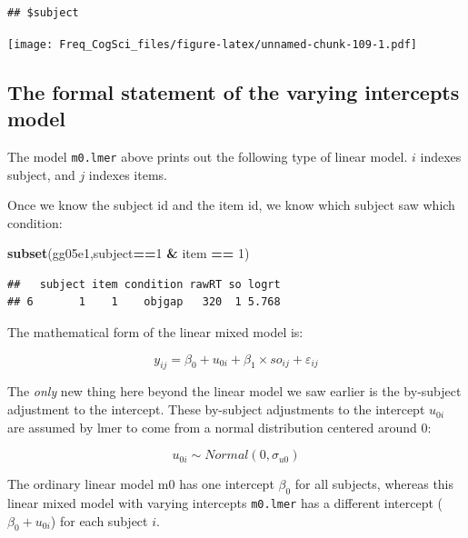 \documentclass[12pt,]{krantz}
\newenvironment{Shaded}{\begin{snugshade}}{\end{snugshade}}
\newcommand{\DecValTok}[1]{\textcolor[rgb]{0.00,0.00,0.81}{#1}}
\newcommand{\KeywordTok}[1]{\textcolor[rgb]{0.13,0.29,0.53}{\textbf{#1}}}
\newcommand{\NormalTok}[1]{#1}
\newcommand{\OperatorTok}[1]{\textcolor[rgb]{0.81,0.36,0.00}{\textbf{#1}}}
\newcommand{\StringTok}[1]{\textcolor[rgb]{0.31,0.60,0.02}{#1}}
\begin{document}
\begin{verbatim}
## $subject
\end{verbatim}

\texttt{[image: Freq\_CogSci\_files/figure-latex/unnamed-chunk-109-1.pdf]}

\hypertarget{the-formal-statement-of-the-varying-intercepts-model}{%
\subsection{The formal statement of the varying intercepts model}\label{the-formal-statement-of-the-varying-intercepts-model}}

The model \texttt{m0.lmer} above prints out the following type of linear model. \(i\) indexes subject, and \(j\) indexes items.

Once we know the subject id and the item id, we know which subject saw which condition:

\begin{Shaded}
\begin{Highlighting}[]
\KeywordTok{subset}\NormalTok{(gg05e1,subject}\OperatorTok{==}\DecValTok{1} \OperatorTok{&}\StringTok{ }\NormalTok{item }\OperatorTok{==}\StringTok{ }\DecValTok{1}\NormalTok{)}
\end{Highlighting}
\end{Shaded}

\begin{verbatim}
##   subject item condition rawRT so logrt
## 6       1    1    objgap   320  1 5.768
\end{verbatim}

The mathematical form of the linear mixed model is:

\begin{equation}
y_{ij} = \beta_0 + u_{0i}+\beta_1\times so_{ij} + \varepsilon_{ij}
\end{equation}

The \emph{only} new thing here beyond the linear model we saw earlier is the by-subject adjustment to the intercept. These by-subject adjustments to the intercept \(u_{0i}\) are assumed by lmer to come from a normal distribution centered around 0:

\begin{equation}
u_{0i} \sim Normal(0,\sigma_{u0})
\end{equation}

The ordinary linear model m0 has one intercept \(\beta_0\) for all subjects, whereas this linear mixed model with varying intercepts \texttt{m0.lmer} has a different intercept (\(\beta_0 + u_{0i}\)) for each subject \(i\).
\end{document}
